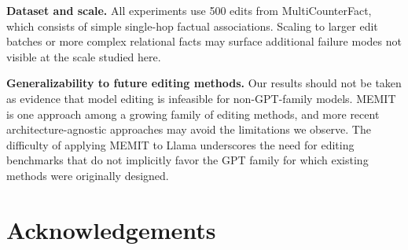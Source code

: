 \documentclass[11pt]{article}
\begin{document}
\vspace{3.5mm}
\noindent \textbf{Dataset and scale.} All experiments use 500 edits from MultiCounterFact, which consists of simple single-hop factual associations. Scaling to larger edit batches or more complex relational facts may surface additional failure modes not visible at the scale studied here.

\vspace{3.5mm}
\noindent \textbf{Generalizability to future editing methods.} Our results should not be taken as evidence that model editing is infeasible for non-GPT-family models. MEMIT is one approach among a growing family of editing methods, and more recent architecture-agnostic approaches may avoid the limitations we observe. The difficulty of applying MEMIT to Llama underscores the need for editing benchmarks that do not implicitly favor the GPT family for which existing methods were originally designed.

\section*{Acknowledgements}



\end{document}
